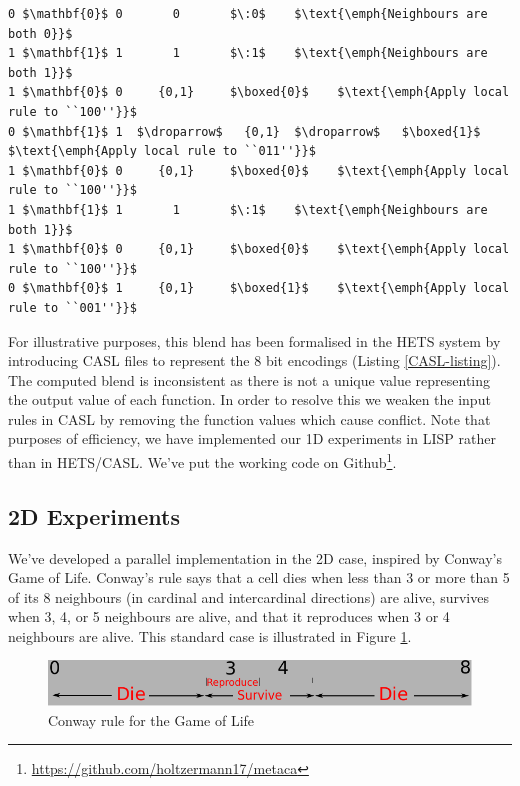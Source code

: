 \documentclass{AISB2008}
\makeatletter
\renewcommand{\boxed}[1]{\text{\fboxsep=.2em\fbox{\m@th$\displaystyle#1$}}}
\newcommand{\droparrow}{%
  \mathchoice{\raisebox{-4pt}{$\displaystyle\mapsto$}}
             {\raisebox{-4pt}{$\mapsto$}}
             {\raisebox{-2pt}{$\scriptstyle\mapsto$}}
             {\raisebox{-2pt}{$\scriptscriptstyle\mapsto$}}}
\makeatother
\begin{document}
\lstset{
  xleftmargin=.05\columnwidth, xrightmargin=.01\columnwidth
}

\begin{lstlisting}[mathescape]
0 $\mathbf{0}$ 0       0       $\:0$    $\text{\emph{Neighbours are both 0}}$
1 $\mathbf{1}$ 1       1       $\:1$    $\text{\emph{Neighbours are both 1}}$
1 $\mathbf{0}$ 0     {0,1}     $\boxed{0}$    $\text{\emph{Apply local rule to ``100''}}$
0 $\mathbf{1}$ 1  $\droparrow$   {0,1}  $\droparrow$   $\boxed{1}$    $\text{\emph{Apply local rule to ``011''}}$
1 $\mathbf{0}$ 0     {0,1}     $\boxed{0}$    $\text{\emph{Apply local rule to ``100''}}$
1 $\mathbf{1}$ 1       1       $\:1$    $\text{\emph{Neighbours are both 1}}$
1 $\mathbf{0}$ 0     {0,1}     $\boxed{0}$    $\text{\emph{Apply local rule to ``100''}}$
0 $\mathbf{0}$ 1     {0,1}     $\boxed{1}$    $\text{\emph{Apply local rule to ``001''}}$
\end{lstlisting}

For illustrative purposes, this blend has been formalised in the HETS
system \cite{mossakowski2007heterogeneous} by introducing CASL files
to represent the 8 bit encodings (Listing \ref{CASL-listing}).
%
The computed blend is inconsistent as there is not a unique value
representing the output value of each function.  In order to resolve
this we weaken the input rules in CASL by removing the function values
which cause conflict.
%
Note that purposes of efficiency, we have implemented our 1D
experiments in LISP rather than in \mbox{HETS}/\mbox{CASL}.  We've put
the working code on
Github\footnote{\url{https://github.com/holtzermann17/metaca}}.


\subsection{2D Experiments} \label{2d-experiments-design}

We've developed a parallel implementation in the 2D case, inspired by
Conway's Game of Life.  Conway's rule says that a cell dies when less
than 3 or more than 5 of its 8 neighbours (in cardinal and
intercardinal directions) are alive, survives when 3, 4, or 5
neighbours are alive, and that it reproduces when 3 or 4 neighbours
are alive.  This standard case is illustrated in Figure
\ref{conway-rule}.

\begin{figure}[!ht]
\includegraphics[width=\columnwidth]{conway}
\caption{Conway rule for the Game of Life\label{conway-rule}}
\end{figure}
\end{document}
